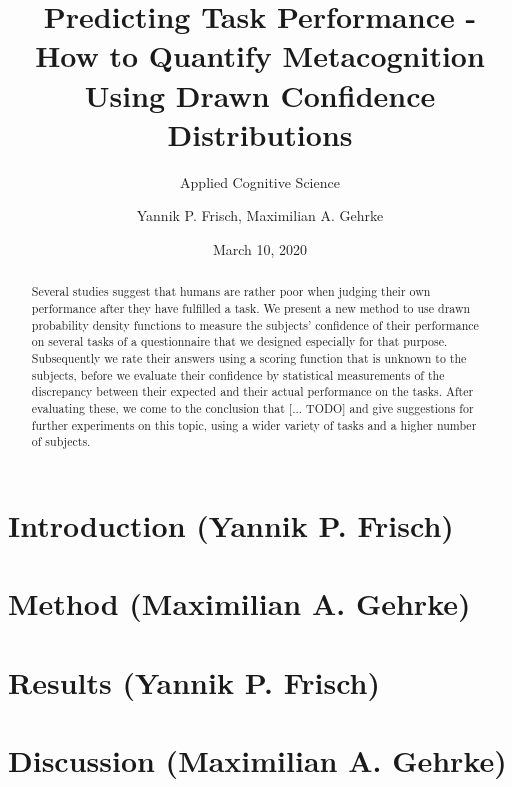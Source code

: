 \documentclass[
pdfa=false,  %
color=9c,
logo=body,
class=article,
marginpar=false,
logofile=../logos/tuda_logo.pdf
]{tudapub}
\author{Yannik P. Frisch, Maximilian A. Gehrke}
\title{Predicting Task Performance - How to Quantify Metacognition Using Drawn Confidence Distributions}
\date{March 10, 2020}
\subtitle{Applied Cognitive Science}
\begin{document}
\maketitle

\begin{abstract}
	Several studies suggest that humans are rather poor when judging their own performance after they have fulfilled a task. We present a new method to use drawn probability density functions to measure the subjects' confidence of their performance on several tasks of a questionnaire that we designed especially for that purpose. Subsequently we rate their answers using a scoring function that is unknown to the subjects, before we evaluate their confidence by statistical measurements of the discrepancy between their expected and their actual performance on the tasks. After evaluating these, we come to the conclusion that [... TODO] and give suggestions for further experiments on this topic, using a wider variety of tasks and a higher number of subjects.
\end{abstract}

\section{Introduction (Yannik P. Frisch)}
	\label{sec:introduction}
	

\newpage
\section{Method (Maximilian A. Gehrke)}
	\label{sec:method}
	

\newpage
\section{Results (Yannik P. Frisch)}
	\label{sec:results}
	

\newpage
\section{Discussion (Maximilian A. Gehrke)}
	\label{sec:discussion}
	


\newpage
{}

\end{document}
